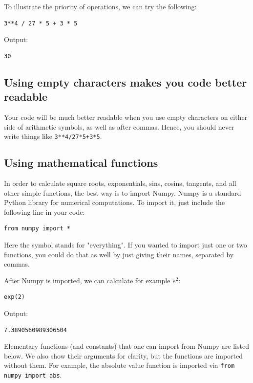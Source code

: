 \documentclass[article,A4,12pt]{llncs}
\begin{document}
To illustrate the priority of operations, we can try the following:

\begin{verbatim}
3**4 / 27 * 5 + 3 * 5
\end{verbatim}
Output:

\begin{verbatim}
30
\end{verbatim}
\subsection{Using empty characters makes you code better readable}
Your code will be much better readable when you use empty
characters on either side of arithmetic symbols, as well as 
after commas. Hence, you should never write things like {\tt 3**4/27*5+3*5}.

\subsection{Using mathematical functions}

In order to calculate square roots, exponentials, sins, cosins, tangents, and all other 
simple functions, the best way is to import Numpy. Numpy is a standard Python library 
for numerical computations. To import it, just include the following 
line in your code:

\begin{verbatim}
from numpy import *
\end{verbatim}
Here the symbol {\tt *} stands for "everything". If you wanted to import just one or two 
functions, you could do that as well by just giving their names, separated by commas. 

After Numpy is imported, we can calculate for example $e^2$:

\begin{verbatim}
exp(2)
\end{verbatim}
Output:
\begin{verbatim}
7.3890560989306504
\end{verbatim}
Elementary functions (and constants) that one can import from Numpy are listed
below. We also show their arguments for clarity, but the functions are imported without 
them. For example, the absolute value function is imported via {\tt from numpy import abs}.\\
\end{document}
